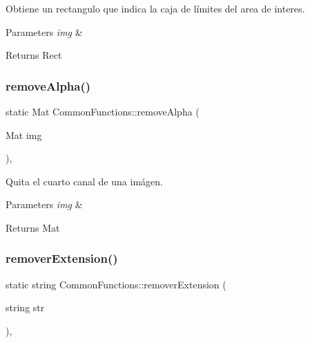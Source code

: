 Obtiene un rectangulo que indica la caja de límites del area de interes. 


\begin{DoxyParams}{Parameters}
{\em img} & \\
\hline
\end{DoxyParams}
\begin{DoxyReturn}{Returns}
Rect 
\end{DoxyReturn}
\mbox{\label{classCommonFunctions_a511266d1137ccdefb6e7c5d156145831}} 
\subsubsection{\texorpdfstring{remove\+Alpha()}{removeAlpha()}}
{\footnotesize\ttfamily static Mat Common\+Functions\+::remove\+Alpha (\begin{DoxyParamCaption}\item[{Mat}]{img }\end{DoxyParamCaption})\hspace{0.3cm}{\ttfamily [inline]}, {\ttfamily [static]}}



Quita el cuarto canal de una imágen. 


\begin{DoxyParams}{Parameters}
{\em img} & \\
\hline
\end{DoxyParams}
\begin{DoxyReturn}{Returns}
Mat 
\end{DoxyReturn}
\mbox{\label{classCommonFunctions_a5393a67a9e631a763fe5874174e386d0}} 
\subsubsection{\texorpdfstring{remover\+Extension()}{removerExtension()}}
{\footnotesize\ttfamily static string Common\+Functions\+::remover\+Extension (\begin{DoxyParamCaption}\item[{string}]{str }\end{DoxyParamCaption})\hspace{0.3cm}{\ttfamily [inline]}, {\ttfamily [static]}}



